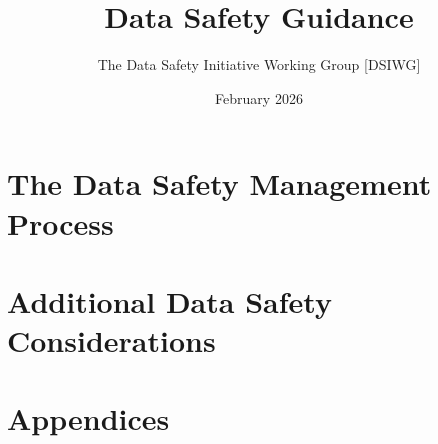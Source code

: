 \title{\textcolor{dsiwgAccentColour}{Data Safety Guidance}}
\author{The Data Safety Initiative Working Group [DSIWG]}
\date{\textcolor{dsiwgAccentColour}{February 2026}}

%
%
%
%
%
%
\ifx\withCovers\undefined
\else
\thispagestyle{empty}%

\clearpage
\thispagestyle{empty}
\phantom{foo}%
\fi


\begin{styleTextbody}%
%
%
\frontmatter

\mainmatter
%
%

\part{The Data Safety Management Process}






\part{Additional Data Safety Considerations}







%


\part{Appendices}
\begin{appendices}
\setcounter{tocdepth}{1}








\end{appendices}
\backmatter

\printindex[locationidx]
\printindex
\clearpage%
%

%
%
\end{styleTextbody}

\ifx\withCovers\undefined
\else
\thispagestyle{empty}

\fi
%

